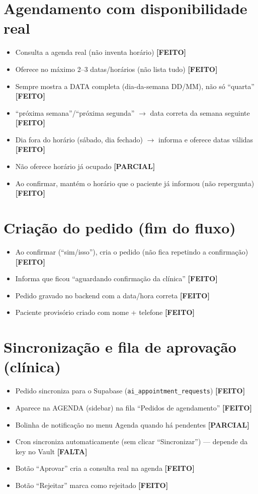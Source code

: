 \documentclass[11pt,a4paper]{article}
\newcommand{\sok}{\textcolor{verde}{\textbf{[FEITO]}}}
\newcommand{\sparc}{\textcolor{ambar}{\textbf{[PARCIAL]}}}
\newcommand{\sfalta}{\textcolor{vermelho}{\textbf{[FALTA]}}}
\begin{document}
\section{Agendamento com disponibilidade real}
\begin{itemize}
  \item Consulta a agenda real (n\~ao inventa hor\'ario) \sok
  \item Oferece no m\'aximo 2--3 datas/hor\'arios (n\~ao lista tudo) \sok
  \item Sempre mostra a DATA completa (dia-da-semana DD/MM), n\~ao s\'o ``quarta'' \sok
  \item ``pr\'oxima semana''/``pr\'oxima segunda'' $\rightarrow$ data correta da semana seguinte \sok
  \item Dia fora do hor\'ario (s\'abado, dia fechado) $\rightarrow$ informa e oferece datas v\'alidas \sok
  \item N\~ao oferece hor\'ario j\'a ocupado \sparc
  \item Ao confirmar, mant\'em o hor\'ario que o paciente j\'a informou (n\~ao repergunta) \sok
\end{itemize}

\section{Cria\c{c}\~ao do pedido (fim do fluxo)}
\begin{itemize}
  \item Ao confirmar (``sim/isso''), cria o pedido (n\~ao fica repetindo a confirma\c{c}\~ao) \sok
  \item Informa que ficou ``aguardando confirma\c{c}\~ao da cl\'inica'' \sok
  \item Pedido gravado no backend com a data/hora correta \sok
  \item Paciente provis\'orio criado com nome + telefone \sok
\end{itemize}

\section{Sincroniza\c{c}\~ao e fila de aprova\c{c}\~ao (cl\'inica)}
\begin{itemize}
  \item Pedido sincroniza para o Supabase (\texttt{ai\_appointment\_requests}) \sok
  \item Aparece na AGENDA (sidebar) na fila ``Pedidos de agendamento'' \sok
  \item Bolinha de notifica\c{c}\~ao no menu Agenda quando h\'a pendentes \sparc
  \item Cron sincroniza automaticamente (sem clicar ``Sincronizar'') --- depende da key no Vault \sfalta
  \item Bot\~ao ``Aprovar'' cria a consulta real na agenda \sok
  \item Bot\~ao ``Rejeitar'' marca como rejeitado \sok
\end{itemize}
\end{document}
